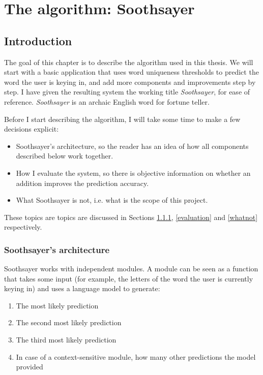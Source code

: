 \documentclass[11pt]{article}
\begin{document}
\section{The algorithm: Soothsayer} \label{algorithm}

\subsection{Introduction}

The goal of this chapter is to describe the algorithm used in this thesis. We will start with a basic application that uses word uniqueness thresholds to predict the word the user is keying in, and add more components and improvements step by step. I have given the resulting system the working title \emph{Soothsayer}, for ease of reference. \emph{Soothsayer} is an archaic English word for fortune teller.

Before I start describing the algorithm, I will take some time to make a few decisions explicit: 

\begin{itemize}
\item Soothsayer's architecture, so the reader has an idea of how all components described below work together.
\item How I evaluate the system, so there is objective information on whether an addition improves the prediction accuracy.
\item What Soothsayer is not, i.e. what is the scope of this project.
\end{itemize}

These topics are topics are discussed in Sections \ref{ss_intro}, \ref{evaluation} and \ref{whatnot} respectively.

\subsubsection{Soothsayer's architecture} \label{ss_intro}
Soothsayer works with independent modules. A module can be seen as a function that takes some input (for example, the letters of the word the user is currently keying in) and uses a language model to generate:

\begin{enumerate}
\item The most likely prediction
\item The second most likely prediction
\item The third most likely prediction
\item In case of a context-sensitive module, how many other predictions the model provided
\end{enumerate}
\end{document}
